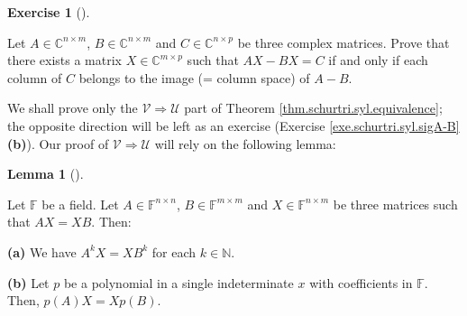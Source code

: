 \documentclass[numbers=enddot,12pt,final,onecolumn,notitlepage]{scrartcl}%
\newcounter{exer}
\numberwithin{exer}{subsection}
\theoremstyle{definition}
\newtheorem{lem}[theo]{Lemma}
\newenvironment{lemma}[1][]
{\begin{lem}[#1]\begin{leftbar}}
{\end{leftbar}\end{lem}}
\newtheorem{exmp}[exer]{Exercise}
\newenvironment{exercise}[1][]
{\begin{exmp}[#1]\begin{leftbar}}
{\end{leftbar}\end{exmp}}
\begin{document}
\begin{exercise}
\label{exe.schurtri.syl.AX-BX} Let $A\in\mathbb{C}^{n\times m}$,
$B\in\mathbb{C}^{n\times m}$ and $C\in\mathbb{C}^{n\times p}$ be three complex
matrices. Prove that there exists a matrix $X\in\mathbb{C}^{m\times p}$ such
that $AX-BX=C$ if and only if each column of $C$ belongs to the image (=
column space) of $A-B$.
\end{exercise}

We shall prove only the $\mathcal{V}\Longrightarrow\mathcal{U}$ part of
Theorem \ref{thm.schurtri.syl.equivalence}; the opposite direction will be
left as an exercise (Exercise \ref{exe.schurtri.syl.sigA-B} \textbf{(b)}). Our
proof of $\mathcal{V}\Longrightarrow\mathcal{U}$ will rely on the following lemma:

\begin{lemma}
\label{lem.schurtri.syl.AX=XB}Let $\mathbb{F}$ be a field. Let $A\in
\mathbb{F}^{n\times n}$, $B\in\mathbb{F}^{m\times m}$ and $X\in\mathbb{F}%
^{n\times m}$ be three matrices such that $AX=XB$. Then: \medskip

\textbf{(a)} We have $A^{k}X=XB^{k}$ for each $k\in\mathbb{N}$. \medskip

\textbf{(b)} Let $p$ be a polynomial in a single indeterminate $x$ with
coefficients in $\mathbb{F}$. Then, $p\left(  A\right)  X=Xp\left(  B\right)
$.
\end{lemma}
\end{document}
